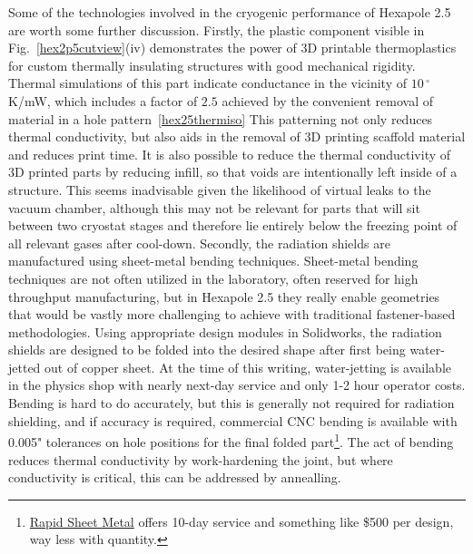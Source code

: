 Some of the technologies involved in the cryogenic performance of Hexapole 2.5 are worth some further discussion.
Firstly, the plastic component visible in Fig.~\ref{hex2p5cutview}(iv) demonstrates the power of 3D printable thermoplastics for custom thermally insulating structures with good mechanical rigidity.
Thermal simulations of this part indicate conductance in the vicinity of $10\,^\circ$K/mW, which includes a factor of $2.5$ achieved by the convenient removal of material in a hole pattern~\ref{hex25thermiso}
This patterning not only reduces thermal conductivity, but also aids in the removal of 3D printing scaffold material and reduces print time.
It is also possible to reduce the thermal conductivity of 3D printed parts by reducing infill, so that voids are intentionally left inside of a structure.
This seems inadvisable given the likelihood of virtual leaks to the vacuum chamber, although this may not be relevant for parts that will sit between two cryostat stages and therefore lie entirely below the freezing point of all relevant gases after cool-down.
Secondly, the radiation shields are manufactured using sheet-metal bending techniques.
Sheet-metal bending techniques are not often utilized in the laboratory, often reserved for high throughput manufacturing, but in Hexapole 2.5 they really enable geometries that would be vastly more challenging to achieve with traditional fastener-based methodologies.
Using appropriate design modules in Solidworks, the radiation shields are designed to be folded into the desired shape after first being water-jetted out of copper sheet.
At the time of this writing, water-jetting is available in the physics shop with nearly next-day service and only 1-2 hour operator costs.
Bending is hard to do accurately, but this is generally not required for radiation shielding, and if accuracy is required, commercial CNC bending is available with 0.005" tolerances on hole positions for the final folded part\footnote{\href{https://rapidmanufacturing.com/rapid-sheet-metal/}{Rapid Sheet Metal} offers 10-day service and something like \$500 per design, way less with quantity.}.
The act of bending reduces thermal conductivity by work-hardening the joint, but where conductivity is critical, this can be addressed by annealling.




